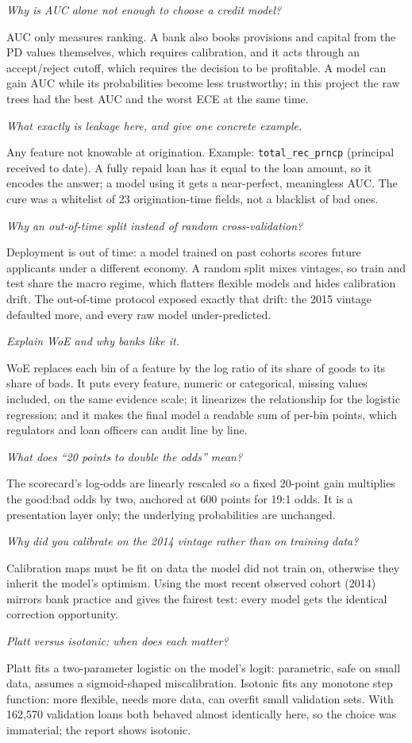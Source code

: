 \documentclass[a4paper,11pt]{article}
\newenvironment{qa}{\begin{description}[leftmargin=0pt,itemsep=6pt]}{\end{description}}
\newcommand{\Q}[1]{\item[Q.] \textit{#1}}
\newcommand{\A}{\item[A.]}
\begin{document}
\begin{qa}
\Q{Why is AUC alone not enough to choose a credit model?}
\A AUC only measures ranking. A bank also books provisions and capital from the PD values themselves, which requires calibration, and it acts through an accept/reject cutoff, which requires the decision to be profitable. A model can gain AUC while its probabilities become less trustworthy; in this project the raw trees had the best AUC and the worst ECE at the same time.

\Q{What exactly is leakage here, and give one concrete example.}
\A Any feature not knowable at origination. Example: \texttt{total\_rec\_prncp} (principal received to date). A fully repaid loan has it equal to the loan amount, so it encodes the answer; a model using it gets a near-perfect, meaningless AUC. The cure was a whitelist of 23 origination-time fields, not a blacklist of bad ones.

\Q{Why an out-of-time split instead of random cross-validation?}
\A Deployment is out of time: a model trained on past cohorts scores future applicants under a different economy. A random split mixes vintages, so train and test share the macro regime, which flatters flexible models and hides calibration drift. The out-of-time protocol exposed exactly that drift: the 2015 vintage defaulted more, and every raw model under-predicted.

\Q{Explain WoE and why banks like it.}
\A WoE replaces each bin of a feature by the log ratio of its share of goods to its share of bads. It puts every feature, numeric or categorical, missing values included, on the same evidence scale; it linearizes the relationship for the logistic regression; and it makes the final model a readable sum of per-bin points, which regulators and loan officers can audit line by line.

\Q{What does ``20 points to double the odds'' mean?}
\A The scorecard's log-odds are linearly rescaled so a fixed 20-point gain multiplies the good:bad odds by two, anchored at 600 points for 19:1 odds. It is a presentation layer only; the underlying probabilities are unchanged.

\Q{Why did you calibrate on the 2014 vintage rather than on training data?}
\A Calibration maps must be fit on data the model did not train on, otherwise they inherit the model's optimism. Using the most recent observed cohort (2014) mirrors bank practice and gives the fairest test: every model gets the identical correction opportunity.

\Q{Platt versus isotonic: when does each matter?}
\A Platt fits a two-parameter logistic on the model's logit: parametric, safe on small data, assumes a sigmoid-shaped miscalibration. Isotonic fits any monotone step function: more flexible, needs more data, can overfit small validation sets. With 162{,}570 validation loans both behaved almost identically here, so the choice was immaterial; the report shows isotonic.


\end{qa}
\end{document}
